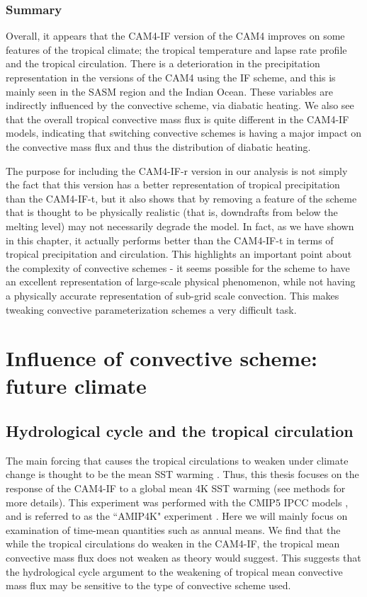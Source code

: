 \documentclass[letterpaper,12pt,titlepage,oneside,final]{book}
\begin{document}
\subsection{Summary}

Overall, it appears that the CAM4-IF version of the CAM4 improves on some features of the tropical climate; the tropical temperature and lapse rate profile and the tropical circulation. There is a deterioration in the precipitation representation in the versions of the CAM4 using the IF scheme, and this is mainly seen in the SASM region and the Indian Ocean. These variables are indirectly influenced by the convective scheme, via diabatic heating. We also see that the overall tropical convective mass flux is quite different in the CAM4-IF models, indicating that switching convective schemes is having a major impact on the convective mass flux and thus the distribution of diabatic heating.

The purpose for including the CAM4-IF-r version in our analysis is not simply the fact that this version has a better representation of tropical precipitation than the CAM4-IF-t, but it also shows that by removing a feature of the scheme that is thought to be physically realistic (that is, downdrafts from below the melting level) may not necessarily degrade the model. In fact, as we have shown in this chapter, it actually performs better than the CAM4-IF-t in terms of tropical precipitation and circulation. This highlights an important point about the complexity of convective schemes - it seems possible for the scheme to have an excellent representation of large-scale physical phenomenon, while not having a physically accurate representation of sub-grid scale convection. This makes tweaking convective parameterization schemes a very difficult task.

\chapter{Influence of convective scheme: future climate}

\section{Hydrological cycle and the tropical circulation}

The main forcing that causes the tropical circulations to weaken under climate change is thought to be the mean SST warming \citep{he_anthropogenic_2015}. Thus, this thesis focuses on the response of the CAM4-IF to a global mean 4K SST warming (see methods for more details). This experiment was performed with the CMIP5 IPCC models \citep{taylor_overview_2011}, and is referred to as the ``AMIP4K" experiment \citep{bony_cfmip:_2011}. Here we will mainly focus on examination of time-mean quantities such as annual means. We find that the while the tropical circulations do weaken in the CAM4-IF, the tropical mean convective mass flux does not weaken as theory would suggest. This suggests that the hydrological cycle argument to the weakening of tropical mean convective mass flux may be sensitive to the type of convective scheme used.
\end{document}
